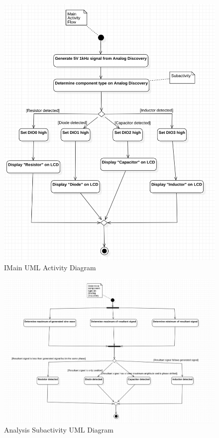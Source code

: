 \documentclass[12pt]{article}
\begin{document}
\begin{figure}[H]
\begin{center}
	\includegraphics[width=\textwidth]{./img/MainUML.png}
	\caption{\label{fig:mainuml}IMain UML Activity Diagram}
\end{center}
\end{figure}

\begin{figure}[H]
\begin{center}
	\includegraphics[width=\textwidth]{./img/AnalysisUML.png}
	\caption{\label{fig:analuml}Analysis Subactivity UML Diagram}
\end{center}
\end{figure}
\end{document}
